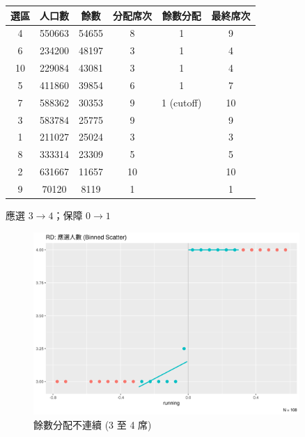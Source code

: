 \documentclass[
  10pt,
  ignorenonframetext,
  aspectratio=43,
]{beamer}
\begin{document}
\begin{frame}
\begin{longtable}[]{@{}cccccc@{}}
\toprule()
選區 & 人口數 & 餘數 & 分配席次 & 餘數分配 & 最終席次 \\
\midrule()
\endhead
\rowcolor{blond} 4 & 550663 & 54655 & 8 & 1 & 9 \\
\rowcolor{blond} 6 & 234200 & 48197 & 3 & 1 & 4 \\
\rowcolor{blond} 10 & 229084 & 43081 & 3 & 1 & 4 \\
\rowcolor{blond} 5 & 411860 & 39854 & 6 & 1 & 7 \\
\rowcolor{blond} 7 & 588362 & 30353 & 9 & 1 (cutoff) & 10 \\
3 & 583784 & 25775 & 9 & & 9 \\
1 & 211027 & 25024 & 3 & & 3 \\
8 & 333314 & 23309 & 5 & & 5 \\
2 & 631667 & 11657 & 10 & & 10 \\
9 & 70120 & 8119 & 1 & & 1 \\
\bottomrule()
\end{longtable}
\end{frame}

\begin{frame}{應選 \(3 \rightarrow 4\)；保障 \(0 \rightarrow 1\)}
\protect\hypertarget{ux61c9ux9078-3-rightarrow-4ux4fddux969c-0-rightarrow-1}{}
\begin{figure}
\centering
\includegraphics[width=0.9\textwidth,height=\textheight]{assets/3to4.png}
\caption{餘數分配不連續 (3 至 4 席)}
\end{figure}
\end{frame}
\end{document}
